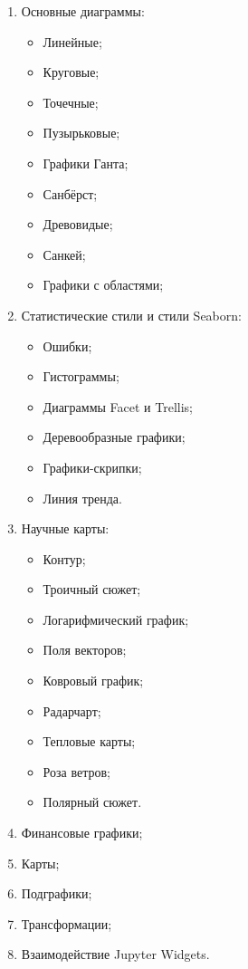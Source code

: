 \begin{enumerate}
	\item Основные диаграммы:
	\begin{itemize}
		\item Линейные;
		\item Круговые;
		\item Точечные;
		\item Пузырьковые;
		\item Графики Ганта;
		\item Санбёрст;
		\item Древовидые;
		\item Санкей;
		\item Графики с областями;
	\end{itemize}

	\item Статистические стили и стили Seaborn:
	\begin{itemize}
		\item Ошибки;
		\item Гистограммы;
		\item Диаграммы Facet и Trellis;
		\item Деревообразные графики;
		\item Графики-скрипки;
		\item Линия тренда.
	\end{itemize}

	\item Научные карты:
	\begin{itemize}
		\item Контур;
		\item Троичный сюжет;
		\item Логарифмический график;
		\item Поля векторов;
		\item Ковровый график;
		\item Радарчарт;
		\item Тепловые карты;
		\item Роза ветров;
		\item Полярный сюжет.
	\end{itemize}

	\item Финансовые графики;
	\item Карты;
	\item Подграфики;
	\item Трансформации;
	\item Взаимодействие Jupyter Widgets.
\end{enumerate}

\newpage
